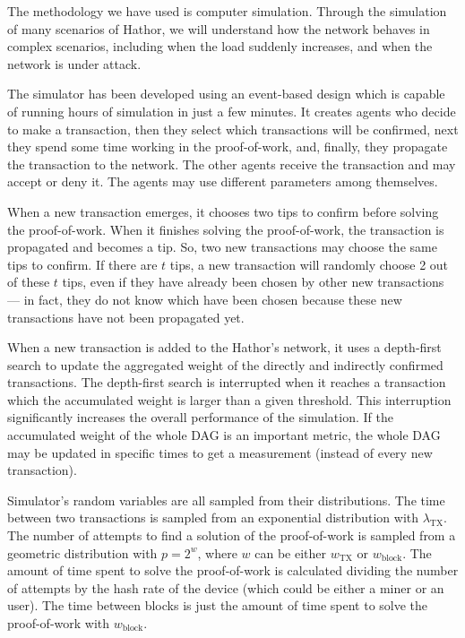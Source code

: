 The methodology we have used is computer simulation. Through the simulation of many scenarios of Hathor, we will understand how the network behaves in complex scenarios, including when the load suddenly increases, and when the network is under attack.

The simulator has been developed using an event-based design which is capable of running hours of simulation in just a few minutes. It creates agents who decide to make a transaction, then they select which transactions will be confirmed, next they spend some time working in the proof-of-work, and, finally, they propagate the transaction to the network. The other agents receive the transaction and may accept or deny it. The agents may use different parameters among themselves.

When a new transaction emerges, it chooses two tips to confirm before solving the proof-of-work. When it finishes solving the proof-of-work, the transaction is propagated and becomes a tip. So, two new transactions may choose the same tips to confirm. If there are $t$ tips, a new transaction will randomly choose 2 out of these $t$ tips, even if they have already been chosen by other new transactions --- in fact, they do not know which have been chosen because these new transactions have not been propagated yet.

When a new transaction is added to the Hathor's network, it uses a depth-first search \citep{cormen2009introduction} to update the aggregated weight of the directly and indirectly confirmed transactions. The depth-first search is interrupted when it reaches a transaction which the accumulated weight is larger than a given threshold. This interruption significantly increases the overall performance of the simulation. If the accumulated weight of the whole DAG is an important metric, the whole DAG may be updated in specific times to get a measurement (instead of every new transaction).


Simulator's random variables are all sampled from their distributions. The time between two transactions is sampled from an exponential distribution with $\lambda_\text{TX}$. The number of attempts to find a solution of the proof-of-work is sampled from a geometric distribution with $p=2^{w}$, where $w$ can be either $w_\text{TX}$ or $w_\text{block}$. The amount of time spent to solve the proof-of-work is calculated dividing the number of attempts by the hash rate of the device (which could be either a miner or an user). The time between blocks is just the amount of time spent to solve the proof-of-work with $w_\text{block}$.

